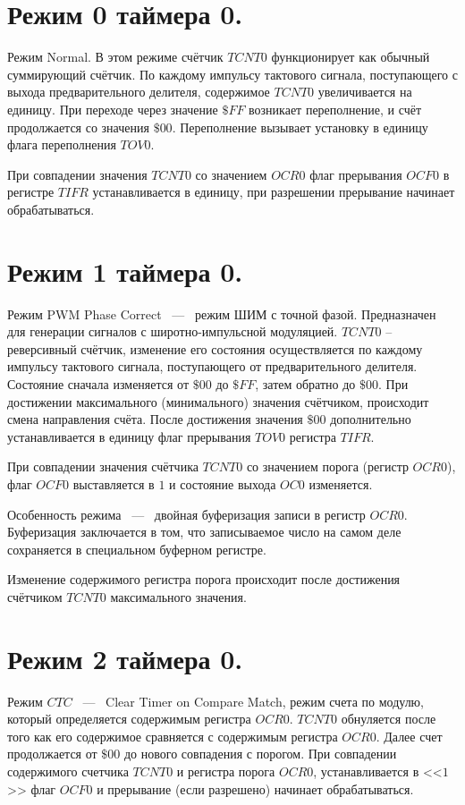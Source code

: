 \section{Режим 0 таймера 0.}
Режим Normal. В этом режиме счётчик $TCNT0$ функционирует как обычный 
суммирующий счётчик. По каждому импульсу тактового сигнала, 
поступающего с выхода предварительного делителя, содержимое
$TCNT0$ увеличивается на единицу. 
При переходе через значение $\$FF$ возникает переполнение, и счёт продолжается
со значения $\$00$. Переполнение вызывает установку в единицу флага переполнения
$TOV0$.

При совпадении значения $TCNT0$ со значением
$OCR0$ флаг прерывания $OCF0$ в регистре $TIFR$ устанавливается в единицу, 
при разрешении прерывание начинает обрабатываться.


\section{Режим 1 таймера 0.}
Режим PWM Phase Correct ~---~ режим ШИМ с точной фазой.
Предназначен для генерации сигналов с широтно-импульсной модуляцией. 
$TCNT0$ -- реверсивный счётчик, изменение его состояния 
осуществляется по каждому импульсу тактового сигнала,
поступающего от предварительного делителя. 
Состояние сначала изменяется от $\$00$ до $\$FF$, затем
обратно до $\$00$. При достижении максимального (минимального) 
значения счётчиком, происходит смена направления счёта. 
После достижения значения $\$00$ дополнительно устанавливается 
в единицу флаг прерывания $TOV0$ регистра $TIFR$.

При совпадении значения счётчика $TCNT0$ со значением порога (регистр $OCR0$), 
флаг $OCF0$ выставляется в $1$ и состояние выхода $OC0$ изменяется.

Особенность режима ~---~ двойная буферизация записи в регистр $OCR0$. 
Буферизация заключается в том, что записываемое число на самом деле сохраняется в
специальном буферном регистре.

Изменение содержимого регистра порога происходит после достижения
счётчиком $TCNT0$ максимального значения.

\section{Режим 2 таймера 0.}
Режим $CTC$ ~---~ Clear Timer on Compare Match, режим счета по модулю, который определяется 
содержимым регистра $OCR0$. $TCNT0$ обнуляется после того как его содержимое сравняется с 
содержимым регистра $OCR0$. Далее счет продолжается от $\$00$ до нового совпадения с порогом. 
При совпадении содержимого счетчика $TCNT0$ и регистра порога $OCR0$, устанавливается в <<$1$>> 
флаг $OCF0$ и прерывание (если разрешено) начинает обрабатываться.


